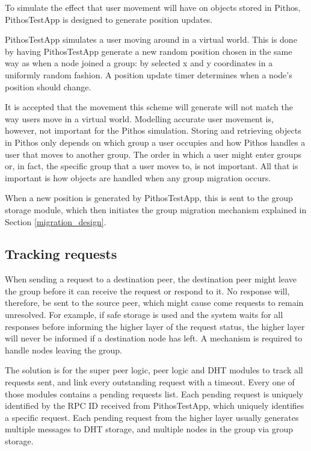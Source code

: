 To simulate the effect that user movement will have on objects stored in Pithos, PithosTestApp is designed to generate position updates.

PithosTestApp simulates a user moving around in a virtual world. This is done by having PithosTestApp generate a new random position chosen in the same way as when a node joined a group: by selected x and y coordinates in a uniformly random fashion. A position update timer determines when a node's position should change.

It is accepted that the movement this scheme will generate will not match the way users move in a virtual world. Modelling accurate user movement is, however, not important for the Pithos simulation. Storing and retrieving objects in Pithos only depends on which group a user occupies and how Pithos handles a user that moves to another group. The order in which a user might enter groups or, in fact, the specific group that a user moves to, is not important. All that is important is how objects are handled when any group migration occurs.

When a new position is generated by PithosTestApp, this is sent to the group storage module, which then initiates the group migration mechanism explained in Section \ref{migration_design}.

\subsection{Tracking requests}
\label{pending_rpcs_implementation}

When sending a request to a destination peer, the destination peer might leave the group before it can receive the request or respond to it. No response will, therefore, be sent to the source peer, which might cause come requests to remain unresolved. For example, if safe storage is used and the system waits for all responses before informing the higher layer of the request status, the higher layer will never be informed if a destination node has left. A mechanism is required to handle nodes leaving the group.

The solution is for the super peer logic, peer logic and DHT modules to track all requests sent, and link every outstanding request with a timeout. Every one of those modules contains a pending requests list. Each pending request is uniquely identified by the RPC ID received from PithosTestApp, which uniquely identifies a specific request. Each pending request from the higher layer usually generates multiple messages to DHT storage, and multiple nodes in the group via group storage.

